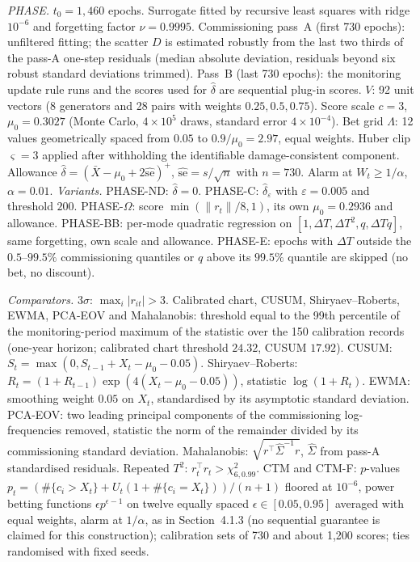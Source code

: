 \documentclass[12pt,a4paper]{article}
\newenvironment{revblock}{}{}
\newenvironment{revblock}{\begingroup\color{revcol}}{\endgroup}
\newcommand{\rtwo}[1]{#1}
\newcommand{\rtwo}[1]{{\color{revcolb}#1}}
\begin{document}
\begin{revblock}
\begin{singlespace}
\smallskip
\noindent\emph{PHASE.} $t_0=1{,}460$ epochs. Surrogate fitted by recursive least squares with ridge $10^{-6}$ and forgetting factor $\nu=0.9995$. Commissioning pass~A (first 730 epochs): unfiltered fitting; the scatter $D$ is estimated robustly from the last two thirds of the pass-A one-step residuals (median absolute deviation, residuals beyond six robust standard deviations trimmed). Pass~B (last 730 epochs): the monitoring update rule runs and the scores used for $\hat\delta$ are sequential plug-in scores. $V$: 92 unit vectors (8 generators and 28 pairs with weights $0.25,0.5,0.75$). Score scale $c=3$, $\mu_0=0.3027$ (Monte Carlo, $4\times10^5$ draws, standard error $4\times10^{-4}$). Bet grid $\Lambda$: 12 values geometrically spaced from $0.05$ to $0.9/\mu_0=2.97$, equal weights. Huber clip $\varsigma=3$ applied after withholding the identifiable damage-consistent component. Allowance $\hat\delta=(\bar X-\mu_0+2\widehat{\mathrm{se}})^{+}$, $\widehat{\mathrm{se}}=s/\sqrt{n}$ with $n=730$. Alarm at $W_t\ge1/\alpha$, $\alpha=0.01$. \emph{Variants.} PHASE-ND: $\hat\delta=0$. PHASE-C: $\hat\delta_\varepsilon$ with $\varepsilon=0.005$ and threshold $200$. PHASE-$\Omega$: score $\min(\|r_t\|/8,1)$, its own $\mu_0=0.2936$ and allowance. PHASE-BB: per-mode quadratic regression on $[1,\Delta T,\Delta T^2,q,\Delta Tq]$, same forgetting, own scale and allowance. PHASE-E: epochs with $\Delta T$ outside the $0.5$--$99.5\%$ commissioning quantiles or $q$ above its $99.5\%$ quantile are skipped (no bet, no discount).

\smallskip
\noindent\emph{Comparators.} $3\sigma$: $\max_i|r_{it}|>3$. Calibrated chart, CUSUM, Shiryaev--Roberts, EWMA, PCA-EOV and Mahalanobis: threshold equal to the 99th percentile of the monitoring-period maximum of the statistic over the 150 calibration records (one-year horizon; calibrated chart threshold $24.32$, CUSUM $17.92$). CUSUM: $S_t=\max(0,S_{t-1}+X_t-\mu_0-0.05)$. Shiryaev--Roberts: $R_t=(1+R_{t-1})\exp(4(X_t-\mu_0-0.05))$, statistic $\log(1+R_t)$. EWMA: smoothing weight $0.05$ on $X_t$, standardised by its asymptotic standard deviation. PCA-EOV: two leading principal components of the commissioning log-frequencies removed, statistic the norm of the remainder divided by its commissioning standard deviation. Mahalanobis: $\sqrt{r^\top\hat\Sigma^{-1}r}$, $\hat\Sigma$ from pass-A standardised residuals. Repeated $T^2$: $r_t^\top r_t>\chi^2_{6,0.99}$. \rtwo{CTM and CTM-F: \rtwo{$p$-values $p_t=(\#\{c_i>X_t\}+U_t(1+\#\{c_i=X_t\}))/(n+1)$ floored at $10^{-6}$, power betting functions $\epsilon p^{\epsilon-1}$ on twelve equally spaced $\epsilon\in[0.05,0.95]$ averaged with equal weights, alarm at $1/\alpha$, as in Section~4.1.3 (no sequential guarantee is claimed for this construction);} calibration sets of 730 and about 1{,}200 scores; ties randomised with fixed seeds.}


\end{singlespace}
\end{revblock}
\end{document}
